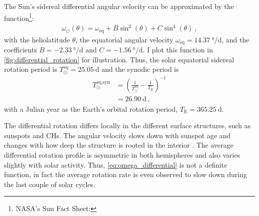 The Sun's sidereal differential angular velocity can be approximated by the function\footnote{NASA's Sun Fact Sheet: }:
\begin{align}
	\omega_\odot(\theta) = \omega_\text{eq} + B \sin^2(\theta) + C \sin^4(\theta)	\,,	\label{eq:omega_differential}
\end{align}
with the heliolatitude $\theta$, the equatorial angular velocity $\omega_\text{eq} = \SI{14.37}{\degree\per\day}$, and the coefficients $B = \SI{-2.33}{\degree\per\day}$ and $C = \SI{-1.56}{\degree\per\day}$. I plot this function in \autoref{fig:differential_rotation} for illustration. Thus, the solar equatorial sidereal rotation period is $T_\odot^\text{eq} = \SI{25.05}{\day}$ and the synodic period is
\begin{align}
	T_\odot^\text{eq,syn} &= \left(\frac{1}{T_\odot^\text{eq}} - \frac{1}{T_\text{E}}\right)^{-1}\\
	&= \SI{26.90}{\day}	\,,	\nonumber
\end{align}
with a Julian year as the Earth's orbital rotation period, $T_\text{E} = \SI{365.25}{\day}$.
\begin{figure}[htb]
\end{figure}

The differential rotation differs locally in the different surface structures, such as sunspots and CHs. The angular velocity slows down with sunspot age and changes with how deep the structure is rooted in the interior \citep{Pulkkinen1998}. The average differential rotation profile is asymmetric in both hemispheres and also varies slightly with solar activity. Thus, \autoref{eq:omega_differential} is not a definite function, in fact the average rotation rate is even observed to slow down during the last couple of solar cycles.

